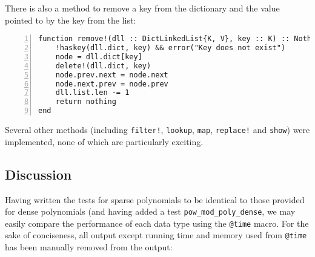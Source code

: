 \documentclass{article}
\theoremstyle{plain}
\numberwithin{theorem}{section}
\numberwithin{example}{section}
\theoremstyle{definition}
\numberwithin{definition}{section}
\begin{document}
There is also a method to remove a key from the dictionary and the value pointed
to by the key from the list:

\begin{codebox}
    \begin{Verbatim}[numbers=left,xleftmargin=5mm]
function remove!(dll :: DictLinkedList{K, V}, key :: K) :: Nothing where {K, V}
    !haskey(dll.dict, key) && error("Key does not exist")
    node = dll.dict[key]
    delete!(dll.dict, key)
    node.prev.next = node.next
    node.next.prev = node.prev
    dll.list.len -= 1
    return nothing
end
    \end{Verbatim}
\end{codebox}

Several other methods (including \texttt{filter!}, \texttt{lookup},
\texttt{map}, \texttt{replace!} and \texttt{show}) were implemented, none of
which are particularly exciting.

\bigbreak

\subsection{Discussion}

Having written the tests for sparse polynomials to be identical to those
provided for dense polynomials (and having added a test
\texttt{pow\_mod\_poly\_dense}, we may easily compare the performance of each
data type using the \texttt{@time} macro. For the sake of conciseness, all
output except running time and memory used from \texttt{@time} has been manually
removed from the output:
\end{document}
